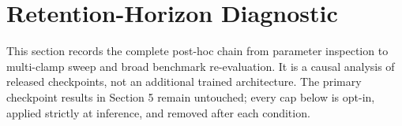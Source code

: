\begin{table}[!ht]
\centering
\small
\setlength{\tabcolsep}{4pt}
\caption{Recorded systems-scale throughput for ATMA's 9.2B stress shape and vLLM 0.25.0 serving Qwen3.5-9B on one L40S (BF16, greedy sampling). Ratio is ATMA/vLLM.}
\label{table:vllm_comparison_matrix}
\end{table}

\section{Retention-Horizon Diagnostic}
\label{appendix:retention_audit}

This section records the complete post-hoc chain from parameter inspection to multi-clamp sweep and broad benchmark re-evaluation. It is a causal analysis of released checkpoints, not an additional trained architecture. The primary checkpoint results in Section 5 remain untouched; every cap below is opt-in, applied strictly at inference, and removed after each condition.

